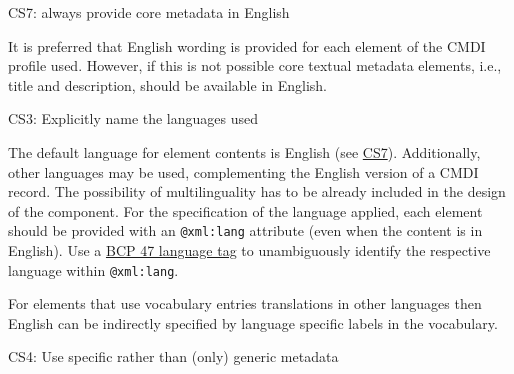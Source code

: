 \begin{workinprogress}

\label{cs7}
CS7: always provide core metadata in English
 


It is preferred that English wording is provided for each element of the CMDI profile used. However, if this is not possible core textual metadata elements, i.e., title and description, should be available in English. 

\label{cs3}
CS3: Explicitly name the languages used
 


The default language for element contents is English (see \hyperref[cs7]{CS7}). Additionally, other languages may be used, complementing the English version of a CMDI record. The possibility of multilinguality has to be already included in the design of the component. For the specification of the language applied, each element should be provided with an \texttt{@xml:lang} attribute (even when the content is in
English). Use a \href{https://tools.ietf.org/rfc/bcp/bcp47.txt}{BCP 47 language tag} \cite{bcp47} to unambiguously identify the respective language within \texttt{@xml:lang}.

For elements that use vocabulary entries translations in other languages then English can be indirectly specified by language specific labels in the vocabulary. 

\end{workinprogress}

\label{cs4}
CS4: Use specific rather than (only) generic metadata


